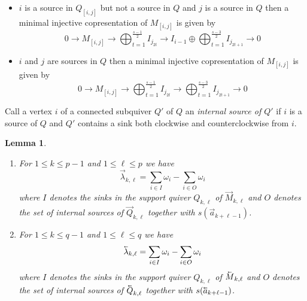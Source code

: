 \documentclass[11pt]{amsart}
\newcommand{\cev}[1]{\reflectbox{\!\ensuremath{\vec{\,\reflectbox{\ensuremath{#1}}}}}}
\newtheorem{lemma}[theorem]{Lemma}
\numberwithin{equation}{section}
\begin{document}
\begin{itemize}
    \item $i$ is a source in $Q_{[i,j]}$ but not a source in $Q$ and $j$ is a source in $Q$ then a minimal injective copresentation of $M_{[i,j]}$ is given by
    \[0\longrightarrow M_{[i,j]}\longrightarrow\bigoplus_{t=1}^{\frac{s-1}{2}} I_{j_{2t}}\longrightarrow I_{i-1}\oplus\bigoplus_{t=1}^{\frac{s-3}{2}} I_{j_{2t+1}}\longrightarrow0\]
    \item $i$ and $j$ are sources in $Q$ then a minimal injective copresentation of $M_{[i,j]}$ is given by
    \[0\longrightarrow M_{[i,j]}\longrightarrow\bigoplus_{t=1}^{\frac{s-1}{2}} I_{j_{2t}}\longrightarrow\bigoplus_{t=1}^{\frac{s-3}{2}} I_{j_{2t+1}}\longrightarrow0\]
  \end{itemize}

  Call a vertex $i$ of a connected subquiver $Q'$ of $Q$ an \emph{internal source of $Q'$} if $i$ is a source of $Q$ and $Q'$ contains a sink both clockwise and counterclockwise from $i$.
  \begin{lemma}\mbox{}
    \begin{enumerate}
      \item For $1\le k\le p-1$ and $1\le\ell\le p$ we have
      \[\vec{\lambda}_{k,\ell}=\sum_{i\in I}\omega_i-\sum_{i\in O}\omega_i\]
      where $I$ denotes the sinks in the support quiver $Q_{k,\ell}$ of $\vec{M}_{k,\ell}$ and $O$ denotes the set of internal sources of $\vec{Q}_{k,\ell}$ together with $s(\vec{a}_{k+\ell-1})$.
      \item For $1\le k\le q-1$ and $1\le\ell\le q$ we have
      \[\cev{\lambda}_{k,\ell}=\sum_{i\in I}\omega_i-\sum_{i\in O}\omega_i\]
      where $I$ denotes the sinks in the support quiver $Q_{k,\ell}$ of $\cev{M}_{k,\ell}$ and $O$ denotes the set of internal sources of $\cev{Q}_{k,\ell}$ together with $s(\cev{a}_{k+\ell-1})$.
    \end{enumerate}
  \end{lemma}
\end{document}
